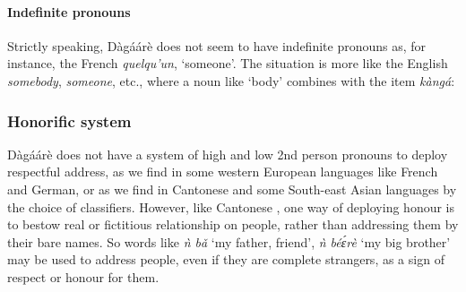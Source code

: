 \paragraph{Indefinite pronouns}



Strictly speaking, Dàgáárè does not seem to have indefinite pronouns as, for
instance, the French \textit{quelqu’un}, ‘someone’. The situation is more like the English \textit{somebody},
\textit{someone}, etc., where a noun like `body' combines with the item \textit{kàngá}:

\ea {}
\z\z

\subsubsection{Honorific system}
Dàgáárè does not have a system of high and low 2nd person pronouns to deploy
respectful address, as we find in some western European languages like French and German,
or as we find in Cantonese and some South-east Asian languages by the choice of classifiers.
However, like Cantonese \citep{Siew-Yue1993}, one way of deploying honour is to bestow real or
fictitious relationship on people, rather than addressing them by their bare names. So words
like \textit{ǹ bǎ} ‘my father, friend’, \textit{ǹ béɛ́rè} ‘my big brother’ may be used to address people, even if
they are complete strangers, as a sign of respect or honour for them.

